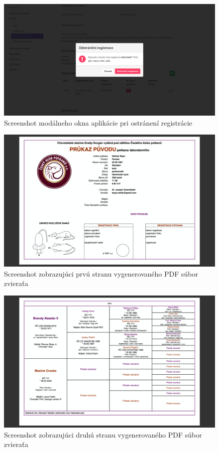 \begin{figure}[H]
	\includegraphics[width=1.0\textwidth]{media/priloha/zviera/registracia/5.png}
	\caption{Screenshot modálneho okna aplikácie pri ostránení registrácie}
\end{figure}

\begin{figure}[H]
	\includegraphics[width=1.0\textwidth]{media/priloha/vseobecne/pdf/1.png}
	\caption{Screenshot zobrazujúci prvú stranu vygenerovaného PDF súbor zvieraťa}
\end{figure}

\begin{figure}[H]
	\includegraphics[width=1.0\textwidth]{media/priloha/vseobecne/pdf/2.png}
	\caption{Screenshot zobrazujúci druhú stranu vygenerovaného PDF súbor zvieraťa}
\end{figure}

